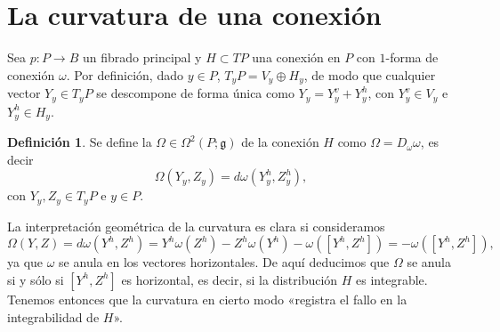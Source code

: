 \documentclass[12pt,a4paper]{article}
\theoremstyle{definition} \newtheorem{defn}[thm]{Definición}
\theoremstyle{definition} \newtheorem{ejemplo}[thm]{Ejemplo}
\theoremstyle{definition} \newtheorem{ejercicio}[thm]{Ejercicio}
\theoremstyle{remark} \newtheorem*{obs}{Observación}
\def\gg{\mathfrak{g}}
\let\emph\relax
\begin{document}
	\section{La curvatura de una conexión}
	Sea $p:P\rightarrow B$ un fibrado principal y $H\subset TP$ una conexión en $P$ con $1$-forma de conexión $\omega$. Por definición, dado $y\in P$, $T_yP=V_y\oplus H_y$, de modo que cualquier vector $Y_y \in T_yP$ se descompone de forma única como $Y_y=Y_y^v+Y_y^h$, con $Y_y^v\in V_y$ e $Y_y^h\in H_y$.  
	\begin{defn}
	  Se define la \emph{curvatura} $\Omega \in \Omega^2(P;\gg)$ de la conexión $H$ como $\Omega=D_\omega \omega$, es decir
	  \begin{equation*}
	    \Omega(Y_y,Z_y)=d\omega(Y_y^h,Z_y^h),
	  \end{equation*}
	  con $Y_y, Z_y \in T_y P$ e $y\in P$.
	\end{defn}

	La interpretación geométrica de la curvatura es clara si consideramos
	\begin{equation*}
	  \Omega(Y,Z)=d\omega(Y^h,Z^h)=Y^h\omega(Z^h)-Z^h\omega(Y^h)-\omega([Y^h,Z^h])=-\omega([Y^h,Z^h]),
	\end{equation*}
	ya que $\omega$ se anula en los vectores horizontales. De aquí deducimos que $\Omega$ se anula si y sólo si $[Y^h,Z^h]$ es horizontal, es decir, si la distribución $H$ es integrable. Tenemos entonces que la curvatura en cierto modo «registra el fallo en la integrabilidad de $H$».
	      
\end{document}
